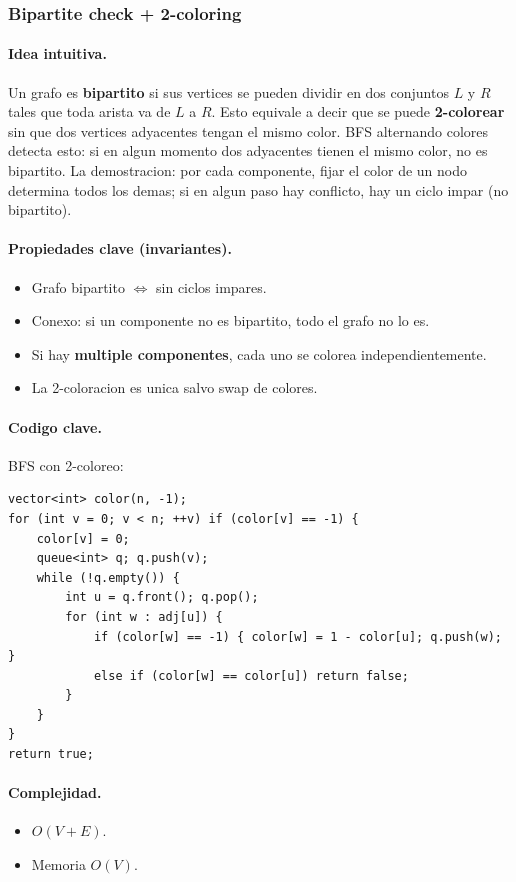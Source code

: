 ﻿\subsubsection{Bipartite check + 2-coloring}

\paragraph{Idea intuitiva.}
Un grafo es \textbf{bipartito} si sus vertices se pueden dividir en dos conjuntos $L$ y $R$ tales que toda arista va de $L$ a $R$. Esto equivale a decir que se puede \textbf{2-colorear} sin que dos vertices adyacentes tengan el mismo color. BFS alternando colores detecta esto: si en algun momento dos adyacentes tienen el mismo color, no es bipartito. La demostracion: por cada componente, fijar el color de un nodo determina todos los demas; si en algun paso hay conflicto, hay un ciclo impar (no bipartito).

\paragraph{Propiedades clave (invariantes).}
\begin{itemize}\setlength\itemsep{0pt}
	\item Grafo bipartito $\Leftrightarrow$ sin ciclos impares.
	\item Conexo: si un componente no es bipartito, todo el grafo no lo es.
	\item Si hay \textbf{multiple componentes}, cada uno se colorea independientemente.
	\item La 2-coloracion es unica salvo swap de colores.
\end{itemize}

\paragraph{Codigo clave.}
BFS con 2-coloreo:
\begin{verbatim}
vector<int> color(n, -1);
for (int v = 0; v < n; ++v) if (color[v] == -1) {
    color[v] = 0;
    queue<int> q; q.push(v);
    while (!q.empty()) {
        int u = q.front(); q.pop();
        for (int w : adj[u]) {
            if (color[w] == -1) { color[w] = 1 - color[u]; q.push(w); }
            else if (color[w] == color[u]) return false;
        }
    }
}
return true;
\end{verbatim}

\paragraph{Complejidad.}
\begin{itemize}\setlength\itemsep{0pt}
	\item $O(V + E)$.
	\item Memoria $O(V)$.
\end{itemize}

